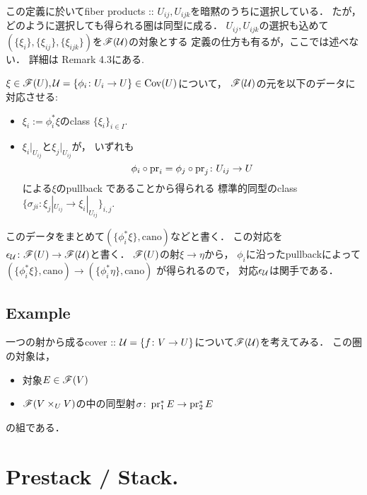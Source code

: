 \documentclass[a4paper, dvipdfmx]{jsarticle}
\begin{document}
\begin{Remark}
    この定義に於いてfiber products :: $U_{ij}, U_{ijk}$を暗黙のうちに選択している．
    たが，どのように選択しても得られる圏は同型に成る．
    $U_{ij}, U_{ijk}$の選択も込めて
    $(\{\xi_i\}, \{\xi_{ij}\}, \{\xi_{ijk}\})$を$\mathscr{F}(\mathcal{U})$の対象とする
    定義の仕方も有るが，ここでは述べない．
    詳細は\cite{NoteGroTop} Remark 4.3にある.
\end{Remark}

\begin{Def} \label{def:epsilon}
    $\xi \in \mathscr{F}(U), \mathcal{U}=\{\phi_i \colon U_i \to U\} \in \operatorname{Cov}(U)$について，
    $\mathscr{F}(\mathcal{U})$の元を以下のデータに対応させる:
    \begin{itemize}
        \item $\xi_i:=\phi_i^*\xi$のclass $\{\xi_i\}_{i \in I}$.
        \item
            $\xi_i|_{U_{ij}}$と$\xi_j|_{U_{ij}}$が，
            いずれも
            \[ \phi_i \circ \operatorname{pr}_i=\phi_j \circ \operatorname{pr}_j \colon U_{ij} \to U \]による$\xi$のpullback
            であることから得られる
            標準的同型のclass $\{ \sigma_{ji} \colon \xi_j|_{U_{ij}} \to \xi_i|_{U_{ij}} \}_{i,j}$.
    \end{itemize}
    このデータをまとめて$(\{\phi_i^*\xi\}, \mathrm{cano})$などと書く．
    この対応を$\epsilon_{\mathcal{U}} \colon \mathscr{F}(U) \to \mathscr{F}(\mathcal{U})$と書く．
    $\mathscr{F}(U)$の射$\xi \to \eta$から，
    $\phi_i$に沿ったpullbackによって$(\{\phi_i^*\xi\}, \mathrm{cano}) \to (\{\phi_i^*\eta\}, \mathrm{cano})$
    が得られるので，
    対応$\epsilon_{\mathcal{U}}$は関手である．
\end{Def}

\subsection{Example}
\begin{Example}
    一つの射から成るcover :: $\mathcal{U}=\{f \colon V \to U\}$について$\mathscr{F}(\mathcal{U})$を考えてみる．
    この圏の対象は，
    \begin{itemize}
        \item 対象$E \in \mathscr{F}(V)$
        \item $\mathscr{F}(V \times_U V)$の中の同型射$\sigma \colon \operatorname{pr}_1^*E \to \operatorname{pr}_2^*E$
    \end{itemize}
    の組である．
\end{Example}

\section{Prestack / Stack.}
\end{document}
